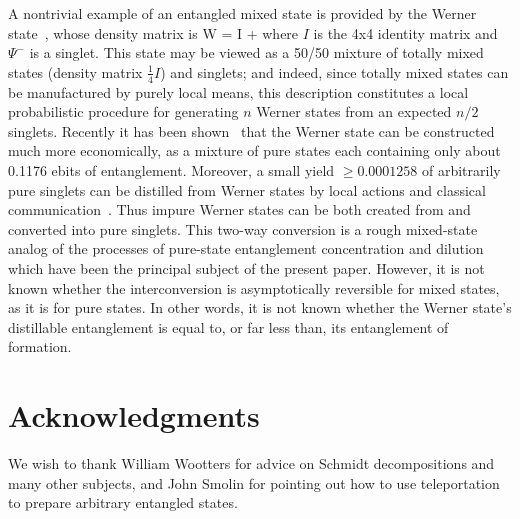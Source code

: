 A nontrivial example of an entangled mixed state is provided by
the Werner state~\cite{Werner}, whose density matrix is
 \beq
W = I + \proj{\Psi^-}
 \eeq where $I$ is the 4x4 identity matrix and $\Psi^-$ is a singlet.
This state may be viewed as a 50/50 mixture of totally mixed states
(density matrix $\frac{1}{4}I$) and singlets; and indeed, since totally
mixed states can be manufactured by purely local means, this description
constitutes a local probabilistic procedure for generating $n$ Werner
states from an expected $n/2$ singlets.  Recently it has been
shown~\cite{BBPSSW95}
that the Werner state can be constructed much more economically, as a
mixture of pure states each containing only about 0.1176 ebits of
entanglement.  Moreover, a small yield $\geq 0.0001258$ of arbitrarily
pure singlets can be distilled from Werner states by local actions and
classical communication~\cite{BBPSSW95}.  Thus impure Werner states can
be both created from and converted into pure singlets.  This two-way
conversion is a rough mixed-state analog of the processes of pure-state
entanglement concentration and dilution which have been the principal
subject of the present paper.  However, it is not known whether the
interconversion is asymptotically reversible for mixed states, as it is
for pure states. In other words, it is not known whether the Werner
state's distillable entanglement is equal to, or far less than, its
entanglement of formation. 


\section*{Acknowledgments} We wish to thank William Wootters for advice
on Schmidt decompositions and many other subjects, and John Smolin for
pointing out how to use teleportation to prepare arbitrary entangled
states.




